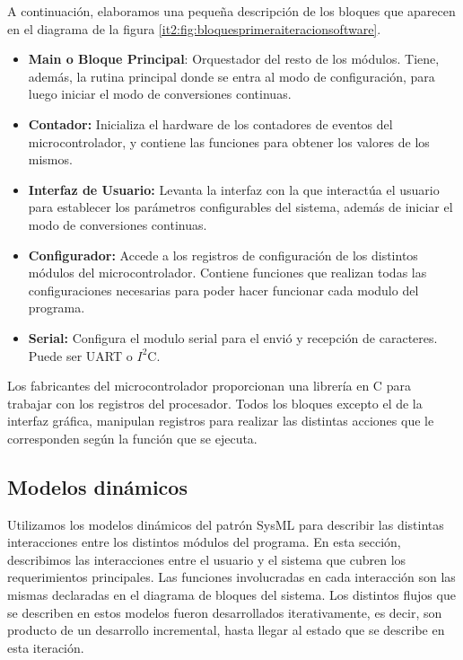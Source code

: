 A continuación, elaboramos una pequeña descripción de los bloques que aparecen en el diagrama de la figura \ref{it2:fig:bloquesprimeraiteracionsoftware}.

\begin{itemize}
  \item \textbf{Main o Bloque Principal}: Orquestador del resto de los módulos. Tiene, además, la rutina principal donde se entra al modo de configuración, para luego iniciar el modo de conversiones continuas.
  \item \textbf{Contador:} Inicializa el hardware de los contadores de eventos del microcontrolador, y contiene las funciones para obtener los valores de los mismos.
  \item \textbf{Interfaz de Usuario:} Levanta la interfaz con la que interactúa el usuario para establecer los parámetros configurables del sistema, además de iniciar el modo de conversiones continuas.
  \item \textbf{Configurador:} Accede a los registros de configuración de los distintos módulos del microcontrolador. Contiene funciones que realizan todas las configuraciones necesarias para poder hacer funcionar cada modulo del programa.
  \item \textbf{Serial:} Configura el modulo serial para el envió y recepción de caracteres. Puede ser UART o $I^{2}$C.
\end{itemize}


Los fabricantes del microcontrolador proporcionan una librería en C para trabajar con los registros del procesador. Todos los bloques excepto el de la interfaz gráfica, manipulan registros para realizar las distintas acciones que le corresponden según la función que se ejecuta.  


\subsection{Modelos dinámicos} %
\label{it2:sub:modelos_dinamicos}

Utilizamos los modelos dinámicos del patrón SysML para describir las distintas interacciones entre los distintos módulos del programa. En esta sección, describimos las interacciones entre el usuario y el sistema que cubren los requerimientos principales. Las funciones involucradas en cada interacción son las mismas declaradas en el diagrama de bloques del sistema. Los distintos flujos que se describen en estos modelos fueron desarrollados iterativamente, es decir, son producto de un desarrollo incremental, hasta llegar al estado que se describe en esta iteración. \\


